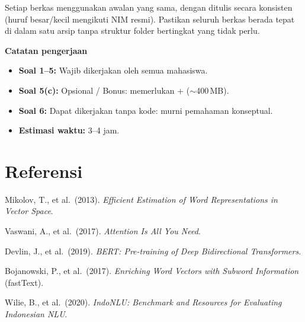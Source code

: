 \documentclass[12pt, a4paper]{article}
\begin{document}
Setiap berkas menggunakan awalan  yang sama, dengan  ditulis secara konsisten (huruf besar/kecil mengikuti NIM resmi). Pastikan seluruh berkas berada tepat di dalam satu arsip  tanpa struktur folder bertingkat yang tidak perlu.

\begin{callout}[ctpBlue]
\textbf{\color{ctpBlue}Catatan pengerjaan}
\begin{itemize}
  \item \textbf{Soal 1--5:} Wajib dikerjakan oleh semua mahasiswa.
  \item \textbf{Soal 5(c):} Opsional / Bonus: memerlukan  +  ($\sim$400\,MB).
  \item \textbf{Soal 6:} Dapat dikerjakan tanpa kode: murni pemahaman konseptual.
  \item \textbf{Estimasi waktu:} 3--4 jam.
\end{itemize}
\end{callout}

\section*{Referensi}
{\small\color{ctpSubtext}
\begin{enumerate}[label={[\arabic*]}, leftmargin=2em]
  \item Mikolov, T., et al.\ (2013). \emph{Efficient Estimation of Word Representations in Vector Space}.
  \item Vaswani, A., et al.\ (2017). \emph{Attention Is All You Need}.
  \item Devlin, J., et al.\ (2019). \emph{BERT: Pre-training of Deep Bidirectional Transformers}.
  \item Bojanowski, P., et al.\ (2017). \emph{Enriching Word Vectors with Subword Information} (fastText).
  \item Wilie, B., et al.\ (2020). \emph{IndoNLU: Benchmark and Resources for Evaluating Indonesian NLU}.
\end{enumerate}}
\end{document}
